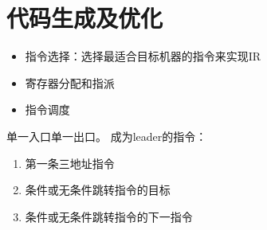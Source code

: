 
\section{代码生成及优化}
\begin{itemize}
	\item 指令选择：选择最适合目标机器的指令来实现IR
	\item 寄存器分配和指派
	\item 指令调度
\end{itemize}

\begin{definition}
单一入口单一出口。
成为leader的指令：
\begin{enumerate}
	\item 第一条三地址指令
	\item 条件或无条件跳转指令的目标
	\item 条件或无条件跳转指令的下一指令
\end{enumerate}
\end{definition}